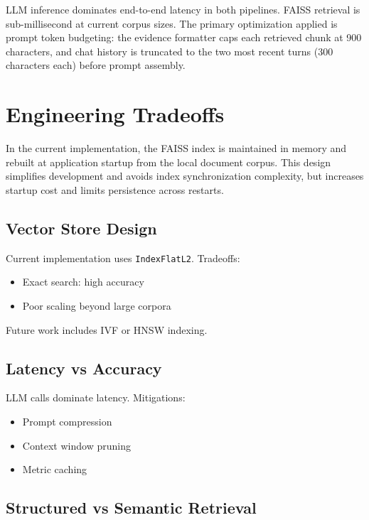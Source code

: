 \documentclass[11pt,twocolumn]{article}
\begin{document}
LLM inference dominates end-to-end latency in both pipelines. FAISS retrieval is sub-millisecond at current corpus sizes. The primary optimization applied is prompt token budgeting: the evidence formatter caps each retrieved chunk at 900 characters, and chat history is truncated to the two most recent turns (300 characters each) before prompt assembly.

\section{Engineering Tradeoffs}

In the current implementation, the FAISS index is maintained in memory and rebuilt at application startup from the local document corpus. This design simplifies development and avoids index synchronization complexity, but increases startup cost and limits persistence across restarts.

\subsection{Vector Store Design}

Current implementation uses \texttt{IndexFlatL2}. Tradeoffs:

\begin{itemize}
    \item Exact search: high accuracy
    \item Poor scaling beyond large corpora
\end{itemize}

Future work includes IVF or HNSW indexing.

\subsection{Latency vs Accuracy}

LLM calls dominate latency. Mitigations:

\begin{itemize}
    \item Prompt compression
    \item Context window pruning
    \item Metric caching
\end{itemize}

\subsection{Structured vs Semantic Retrieval}
\end{document}
